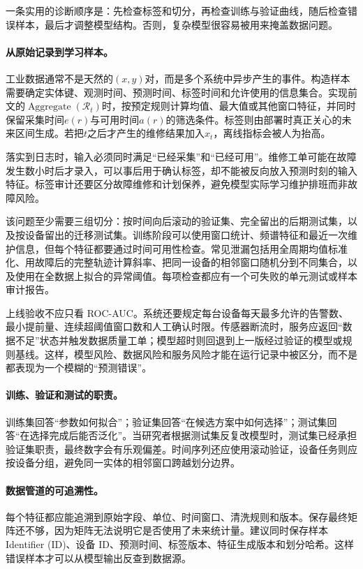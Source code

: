 \begin{remark}
 一条实用的诊断顺序是：先检查标签和切分，再检查训练与验证曲线，随后检查错误样本，最后才调整模型结构。否则，复杂模型很容易被用来掩盖数据问题。
\end{remark}

\paragraph{从原始记录到学习样本。}
工业数据通常不是天然的$(x,y)$对，而是多个系统中异步产生的事件。构造样本需要确定实体键、观测时间、预测时间、标签时间和允许使用的信息集合。实现前文的$\operatorname{Aggregate}(\mathcal R_t)$时，按预定规则计算均值、最大值或其他窗口特征，并同时保留采集时间$e(r)$与可用时间$a(r)$的筛选条件。标签则由部署时真正关心的未来区间生成。若把$t$之后才产生的维修结果加入$x_t$，离线指标会被人为抬高。

落实到日志时，输入必须同时满足“已经采集”和“已经可用”。维修工单可能在故障发生数小时后才录入，可以事后用于确认标签，却不能被反向放入预测时刻的输入特征。标签审计还要区分故障维修和计划保养，避免模型实际学习维护排班而非故障风险。

该问题至少需要三组切分：按时间向后滚动的验证集、完全留出的后期测试集，以及按设备留出的迁移测试集。训练阶段可以使用窗口统计、频谱特征和最近一次维护信息，但每个特征都要通过时间可用性检查。常见泄漏包括用全周期均值标准化、用故障后的完整轨迹计算斜率、把同一设备的相邻窗口随机分到不同集合，以及使用在全数据上拟合的异常阈值。每项检查都应有一个可失败的单元测试或样本审计报告。

上线验收不应只看 ROC-AUC。系统还要规定每台设备每天最多允许的告警数、最小提前量、连续超阈值窗口数和人工确认时限。传感器断流时，服务应返回“数据不足”状态并触发数据质量工单；模型超时则回退到上一版经过验证的模型或规则基线。这样，模型风险、数据风险和服务风险才能在运行记录中被区分，而不是都表现为一个模糊的“预测错误”。

\paragraph{训练、验证和测试的职责。}
训练集回答“参数如何拟合”；验证集回答“在候选方案中如何选择”；测试集回答“在选择完成后能否泛化”。当研究者根据测试集反复改模型时，测试集已经承担验证集职责，最终数字会有乐观偏差。时间序列还应使用滚动验证，设备任务则应按设备分组，避免同一实体的相邻窗口跨越划分边界。

\paragraph{数据管道的可追溯性。}
每个特征都应能追溯到原始字段、单位、时间窗口、清洗规则和版本。保存最终矩阵还不够，因为矩阵无法说明它是否使用了未来统计量。建议同时保存样本 Identifier (ID)、设备 ID、预测时间、标签版本、特征生成版本和划分哈希。这样错误样本才可以从模型输出反查到数据源。

